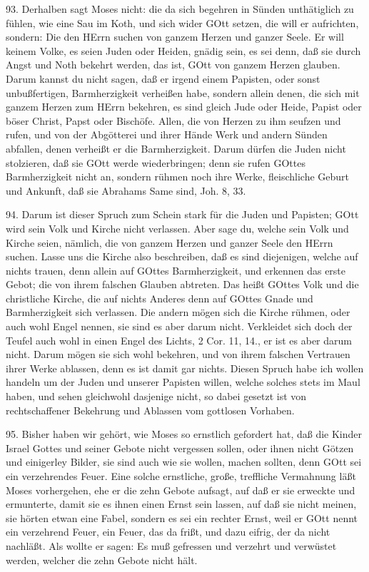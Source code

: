93. Derhalben sagt Moses nicht: die da sich begehren in Sünden unthätiglich zu fühlen, wie eine Sau im Koth, und sich wider GOtt setzen, die will er aufrichten, sondern: Die den HErrn suchen von ganzem Herzen und ganzer Seele. Er will keinem Volke, es seien Juden oder Heiden, gnädig sein, es sei denn, daß sie durch Angst und Noth bekehrt werden, das ist, GOtt von ganzem Herzen glauben. Darum kannst du nicht sagen, daß er irgend einem Papisten, oder sonst unbußfertigen, Barmherzigkeit verheißen habe, sondern allein denen, die sich mit ganzem Herzen zum HErrn bekehren, es sind gleich Jude oder Heide, Papist oder böser Christ, Papst oder Bischöfe. Allen, die von Herzen zu ihm seufzen und rufen, und von der Abgötterei und ihrer Hände Werk und andern Sünden abfallen, denen verheißt er die Barmherzigkeit. Darum dürfen die Juden nicht stolzieren, daß sie GOtt werde wiederbringen; denn sie rufen GOttes Barmherzigkeit nicht an, sondern rühmen noch ihre Werke, fleischliche Geburt und Ankunft, daß sie Abrahams Same sind, Joh. 8, 33.

94. Darum ist dieser Spruch zum Schein stark für die Juden und Papisten; GOtt wird sein Volk und Kirche nicht verlassen. Aber sage du, welche sein Volk und Kirche seien, nämlich, die von ganzem Herzen und ganzer Seele den HErrn suchen. Lasse uns die Kirche also beschreiben, daß es sind diejenigen, welche auf nichts trauen, denn allein auf GOttes Barmherzigkeit, und erkennen das erste Gebot; die von ihrem falschen Glauben abtreten. Das heißt GOttes Volk und die christliche Kirche, die auf nichts Anderes denn auf GOttes Gnade und Barmherzigkeit sich verlassen. Die andern mögen sich die Kirche rühmen, oder auch wohl Engel nennen, sie sind es aber darum nicht. Verkleidet sich doch der Teufel auch wohl in einen Engel des Lichts, 2 Cor. 11, 14., er ist es aber darum nicht. Darum mögen sie sich wohl bekehren, und von ihrem falschen Vertrauen ihrer Werke ablassen, denn es ist damit gar nichts. Diesen Spruch habe ich wollen handeln um der Juden und unserer Papisten willen, welche solches stets im Maul haben, und sehen gleichwohl dasjenige nicht, so dabei gesetzt ist von rechtschaffener Bekehrung und Ablassen vom gottlosen Vorhaben.

95. Bisher haben wir gehört, wie Moses so ernstlich gefordert hat, daß die Kinder Israel
Gottes und seiner Gebote nicht vergessen sollen, oder ihnen nicht Götzen und einigerley Bilder, sie sind auch wie sie wollen, machen sollten, denn GOtt sei ein verzehrendes Feuer. Eine solche ernstliche, große, treffliche Vermahnung läßt Moses vorhergehen, ehe er die zehn Gebote aufsagt, auf daß er sie erweckte und ermunterte, damit sie es ihnen einen Ernst sein lassen, auf daß sie nicht meinen, sie hörten etwan eine Fabel, sondern es sei ein rechter Ernst, weil er GOtt nennt ein verzehrend Feuer, ein Feuer, das da frißt, und dazu eifrig, der da nicht nachläßt. Als wollte er sagen: Es muß gefressen und verzehrt und verwüstet werden, welcher die zehn Gebote nicht hält.

